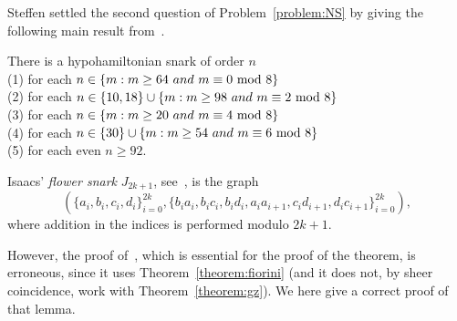 \documentclass{amcjoucc}
\begin{document}
Steffen settled the second question of Problem~\ref{problem:NS} by giving the following main result from~\cite{St01}.

\begin{theorem}\label{Steffen}
There is a hypohamiltonian snark of order $n$\\
(1) for each $n \in \{ m : m \ge 64 \ and \ m \equiv 0 \ {\rm mod} \ 8 \}$\\
(2) for each $n \in \{ 10, 18 \} \cup \{ m : m \ge 98 \ and \ m \equiv 2 \ {\rm mod} \ 8 \}$\\
(3) for each $n \in \{ m : m \ge 20 \ and \ m \equiv 4 \ {\rm mod} \ 8 \}$\\
(4) for each $n \in \{ 30 \} \cup \{ m : m \ge 54 \ and \ m \equiv 6 \ {\rm mod} \ 8 \}$\\
(5) for each even $n \ge 92$.
\end{theorem}

Isaacs' \emph{flower snark} $J_{2k+1}$, see~\cite{Is75}, is the graph $$\left( \{ a_i, b_i, c_i, d_i \}_{i = 0}^{2k}, \{ b_ia_i, b_ic_i, b_id_i, a_ia_{i+1}, c_id_{i+1}, d_ic_{i+1} \}_{i = 0}^{2k} \right),$$ where addition in the indices is performed modulo $2k + 1$.


However, the proof of~\cite[Lemma 2.3]{St01}, which is essential for the proof of the theorem, is erroneous, since it uses Theorem~\ref{theorem:fiorini} (and it does not, by sheer coincidence, work with Theorem~\ref{theorem:gz}). We here give a correct proof of that lemma.
\end{document}
